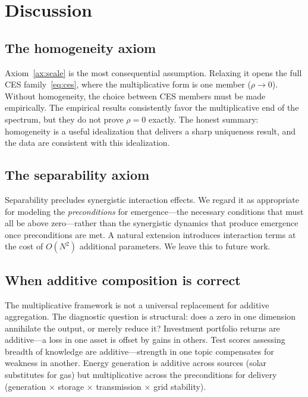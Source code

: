 \documentclass[12pt, a4paper]{article}
\theoremstyle{definition}
\theoremstyle{remark}
\begin{document}
\section{Discussion}\label{sec:discussion}

\subsection{The homogeneity axiom}\label{sec:homogeneity}

Axiom~\ref{ax:scale} is the most consequential assumption. Relaxing it opens the full CES family~\eqref{eq:ces}, where the multiplicative form is one member ($\rho \to 0$). Without homogeneity, the choice between CES members must be made empirically. The empirical results consistently favor the multiplicative end of the spectrum, but they do not prove $\rho = 0$ exactly. The honest summary: homogeneity is a useful idealization that delivers a sharp uniqueness result, and the data are consistent with this idealization.

\subsection{The separability axiom}\label{sec:separability}

Separability precludes synergistic interaction effects. We regard it as appropriate for modeling the \textit{preconditions} for emergence---the necessary conditions that must all be above zero---rather than the synergistic dynamics that produce emergence once preconditions are met. A natural extension introduces interaction terms at the cost of $O(N^2)$ additional parameters. We leave this to future work.

\subsection{When additive composition is correct}\label{sec:whenadd}

The multiplicative framework is not a universal replacement for additive aggregation. The diagnostic question is structural: does a zero in one dimension annihilate the output, or merely reduce it? Investment portfolio returns are additive---a loss in one asset is offset by gains in others. Test scores assessing breadth of knowledge are additive---strength in one topic compensates for weakness in another. Energy generation is additive across sources (solar substitutes for gas) but multiplicative across the preconditions for delivery (generation $\times$ storage $\times$ transmission $\times$ grid stability).
\end{document}
